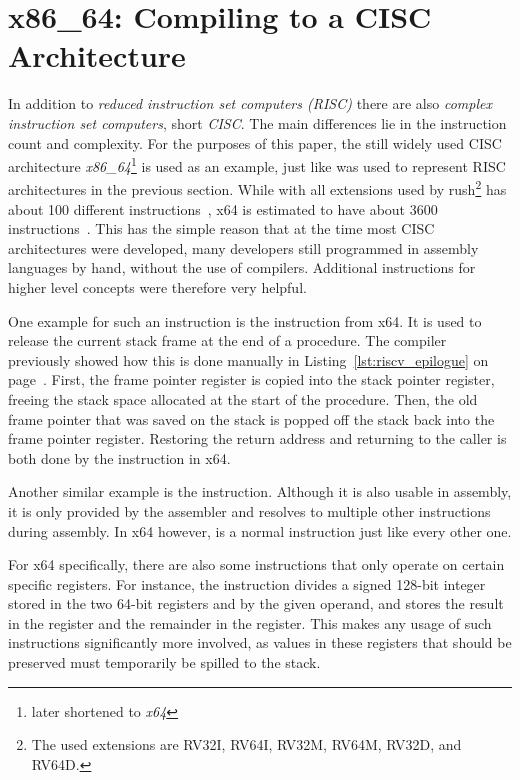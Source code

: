 \newpage
\section{x86\_64: Compiling to a CISC Architecture}

In addition to \emph{reduced instruction set computers (RISC)} there are also \emph{complex instruction set computers}, short \emph{CISC}.
The main differences lie in the instruction count and complexity.
For the purposes of this paper, the still widely used CISC architecture \emph{x86\_64}\footnote{later shortened to \emph{x64}} is used as an example, just like \riscv{} was used to represent RISC architectures in the previous section.
While \riscv{} with all extensions used by rush\footnote{The used extensions are RV32I, RV64I, RV32M, RV64M, RV32D, and RV64D.} has about 100 different instructions~\cite[Chapter~24]{Waterman2019}, x64 is estimated to have about 3600 instructions~\cite{Rodgers2017}.
This has the simple reason that at the time most CISC architectures were developed, many developers still programmed in assembly languages by hand, without the use of compilers.
Additional instructions for higher level concepts were therefore very helpful.

One example for such an instruction is the  instruction from x64.
It is used to release the current stack frame at the end of a procedure.
The \riscv{} compiler previously showed how this is done manually in Listing~\ref{lst:riscv_epilogue} on page~\pageref{lst:riscv_epilogue}.
First, the frame pointer register is copied into the stack pointer register, freeing the stack space allocated at the start of the procedure.
Then, the old frame pointer that was saved on the stack is popped off the stack back into the frame pointer register.
Restoring the return address and returning to the caller is both done by the  instruction in x64.

Another similar example is the  instruction.
Although it is also usable in \riscv{} assembly, it is only provided by the assembler and resolves to multiple other \riscv{} instructions during assembly.
In x64 however,  is a normal instruction just like every other one.

For x64 specifically, there are also some instructions that only operate on certain specific registers.
For instance, the  instruction divides a signed 128-bit integer stored in the two 64-bit registers  and  by the given operand, and stores the result in the  register and the remainder in the  register. This makes any usage of such instructions significantly more involved, as values in these registers that should be preserved must temporarily be spilled to the stack.

